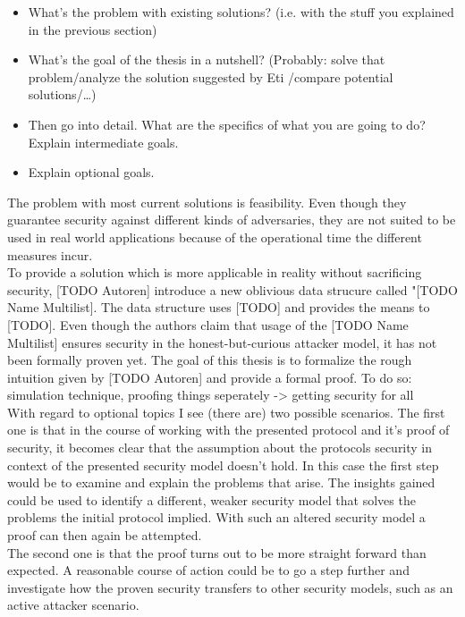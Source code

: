 
\begin{itemize}
  \item What's the problem with existing solutions? (i.e. with the stuff you explained in the previous section)
  \item What's the goal of the thesis in a nutshell? (Probably: solve that problem/analyze the solution suggested by Eti \cite{testref}/compare potential solutions/\dots)
  \item Then go into detail. What are the specifics of what you are going to do? Explain intermediate goals.
  \item Explain optional goals.
\end{itemize}
The problem with most current solutions is feasibility. Even though they guarantee security against different kinds of adversaries, they are not suited to be used in real world applications because of the operational time the different measures incur.\\
To provide a solution which is more applicable in reality without sacrificing security, [TODO Autoren] introduce a new oblivious data strucure called "[TODO Name Multilist]. The data structure uses [TODO] and provides the means to [TODO]. Even though the authors claim that usage of the [TODO Name Multilist] ensures security in the honest-but-curious attacker model, it has not been formally proven yet. The goal of this thesis is to formalize the rough intuition given by [TODO Autoren] and provide a formal proof.
To do so: simulation technique, proofing things seperately -> getting security for all
\ \\With regard to optional topics I see (there are) two possible scenarios. 
The first one is that in the course of working with the presented protocol and it's proof of security, it becomes clear that the assumption about the protocols security in context of the presented security model doesn't hold. In this case the first step would be to examine and explain the problems that arise. The insights gained could be used to identify a different, weaker security model that solves the problems the initial protocol implied. With such an altered security model a proof can then again be attempted.\\
The second one is that the proof turns out to be more straight forward than expected. A reasonable course of action could be to go a step further and investigate how the proven security transfers to other security models, such as an active attacker scenario.
